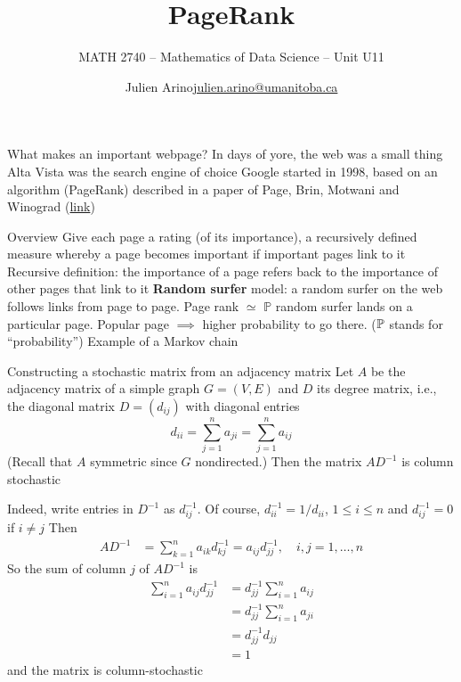 \documentclass[aspectratio=169]{beamer}\usepackage[]{graphicx}\usepackage[]{xcolor}
\subtitle{MATH 2740 -- Mathematics of Data Science -- Unit U11}
\author{\texorpdfstring{Julien Arino\newline\url{julien.arino@umanitoba.ca}}{Julien Arino}}
\institute{Department of Mathematics @ University of Manitoba}
\title{PageRank}
\begin{document}
\SStitlepage
\SSoutlinepage


\begin{frame}{What makes an important webpage?}
	In days of yore, the web was a small thing
	\vfill
	Alta Vista was the search engine of choice
	\vfill
	Google started in 1998, based on an algorithm (PageRank) described in a paper of Page, Brin, Motwani and Winograd (\href{https://storm.cis.fordham.edu/~gweiss/selected-papers/classic-pagerank-paper.pdf}{link})
\end{frame}

\begin{frame}{Overview}
	Give each page a rating (of its importance), a recursively defined measure whereby a page becomes important if important pages link to it
	\vfill
	Recursive definition: the importance of a page refers back to the importance of other pages that link to it
	\vfill
	\textbf{Random surfer} model: a random surfer on the web follows links from page to page. Page rank $\simeq$ $\mathbb{P}$ random surfer lands on a particular page. Popular page $\implies$ higher probability to go there.  
	($\mathbb{P}$ stands for ``probability'')
	\vfill Example of a Markov chain
\end{frame}


\begin{frame}{Constructing a stochastic matrix from an adjacency matrix}
	Let $A$ be the adjacency matrix of a simple graph $G=(V,E)$ and $D$ its degree matrix, i.e., the diagonal matrix $D=(d_{ij})$ with diagonal entries
	\[
		d_{ii} = \sum_{j=1}^n a_{ji} =\sum_{j=1}^n a_{ij}
	\]
	(Recall that $A$ symmetric since $G$ nondirected.)
	Then the matrix $AD^{-1}$ is column stochastic
\end{frame}

\begin{frame}
	Indeed, write entries in $D^{-1}$ as $d_{ij}^{-1}$. Of course, $d_{ii}^{-1} = 1/d_{ii}$, $1\leq i\leq n$ and $d_{ij}^{-1} = 0$ if $i\neq j$
	\vfill
	Then
	\begin{align*}
		AD^{-1} &= \sum_{k=1}^n a_{ik}d_{kj}^{-1}
		= a_{ij}d_{jj}^{-1}
		,\quad i,j=1,\ldots,n
	\end{align*}
	So the sum of column $j$ of $AD^{-1}$ is 
	\begin{align*}
		\sum_{i=1}^n a_{ij}d_{jj}^{-1} 
		&= d_{jj}^{-1} \sum_{i=1}^n a_{ij} \\
		&= d_{jj}^{-1} \sum_{i=1}^n a_{ji} \\
		&= d_{jj}^{-1} d_{jj} \\
		&= 1
	\end{align*}
	and the matrix is column-stochastic
\end{frame}
	
\end{document}
